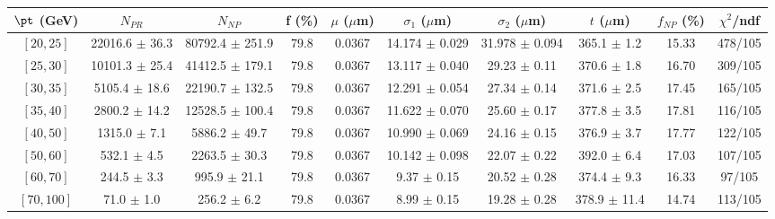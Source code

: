 \begin{tabular}{c||c|c|c|c|c|c|c||c|c}
$\pt$ (GeV) & $N_{PR}$ & $N_{NP}$ & f (\%) & $\mu$ ($\mu$m) & $\sigma_1$ ($\mu$m) & $\sigma_2$ ($\mu$m)  & $t$ ($\mu$m) & $f_{NP}$ (\%) & $\chi^2$/ndf \\
\hline
$[20, 25]$ & 22016.6 $\pm$ 36.3 & 80792.4 $\pm$ 251.9 & 79.8 & 0.0367 & 14.174 $\pm$ 0.029 & 31.978 $\pm$ 0.094 & 365.1 $\pm$ 1.2 & 15.33 & 478/105\\
$[25, 30]$ & 10101.3 $\pm$ 25.4 & 41412.5 $\pm$ 179.1 & 79.8 & 0.0367 & 13.117 $\pm$ 0.040 & 29.23 $\pm$ 0.11 & 370.6 $\pm$ 1.8 & 16.70 & 309/105\\
$[30, 35]$ & 5105.4 $\pm$ 18.6 & 22190.7 $\pm$ 132.5 & 79.8 & 0.0367 & 12.291 $\pm$ 0.054 & 27.34 $\pm$ 0.14 & 371.6 $\pm$ 2.5 & 17.45 & 165/105\\
$[35, 40]$ & 2800.2 $\pm$ 14.2 & 12528.5 $\pm$ 100.4 & 79.8 & 0.0367 & 11.622 $\pm$ 0.070 & 25.60 $\pm$ 0.17 & 377.8 $\pm$ 3.5 & 17.81 & 116/105\\
$[40, 50]$ & 1315.0 $\pm$ 7.1 & 5886.2 $\pm$ 49.7 & 79.8 & 0.0367 & 10.990 $\pm$ 0.069 & 24.16 $\pm$ 0.15 & 376.9 $\pm$ 3.7 & 17.77 & 122/105\\
$[50, 60]$ & 532.1 $\pm$ 4.5 & 2263.5 $\pm$ 30.3 & 79.8 & 0.0367 & 10.142 $\pm$ 0.098 & 22.07 $\pm$ 0.22 & 392.0 $\pm$ 6.4 & 17.03 & 107/105\\
$[60, 70]$ & 244.5 $\pm$ 3.3 & 995.9 $\pm$ 21.1 & 79.8 & 0.0367 & 9.37 $\pm$ 0.15 & 20.52 $\pm$ 0.28 & 374.4 $\pm$ 9.3 & 16.33 & 97/105\\
$[70, 100]$ & 71.0 $\pm$ 1.0 & 256.2 $\pm$ 6.2 & 79.8 & 0.0367 & 8.99 $\pm$ 0.15 & 19.28 $\pm$ 0.28 & 378.9 $\pm$ 11.4 & 14.74 & 113/105\\
\end{tabular}
